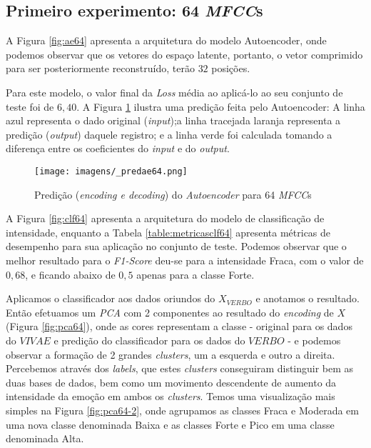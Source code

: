 \subsection{Primeiro experimento: 64 \textit{MFCC}s}

A Figura \ref{fig:ae64} apresenta a arquitetura do modelo Autoencoder, onde podemos observar que os vetores do espaço latente, portanto, o vetor comprimido para ser posteriormente reconstruído, terão $32$ posições.

Para este modelo, o valor final da \textit{Loss} média ao aplicá-lo ao seu conjunto de teste foi de $6,40$. A Figura \ref{fig:predae64} ilustra uma predição feita pelo Autoencoder: A linha azul representa o dado original (\textit{input});a linha tracejada laranja representa a predição (\textit{output}) daquele registro; e a linha verde foi calculada tomando a diferença entre os coeficientes do \textit{input} e do \textit{output}.

\begin{figure}[h]
    \centering
    \texttt{[image: imagens/\_predae64.png]}
    \caption{\label{fig:predae64}Predição (\textit{encoding e decoding}) do \textit{Autoencoder} para 64 \textit{MFCC}s}
\end{figure}

A Figura \ref{fig:clf64} apresenta a arquitetura do modelo de classificação de intensidade, enquanto a Tabela \ref{table:metricasclf64} apresenta métricas de desempenho para sua aplicação no conjunto de teste. Podemos observar que o melhor resultado para o \textit{F1-Score} deu-se para a intensidade Fraca, com o valor de $0,68$, e ficando abaixo de $0,5$ apenas para a classe Forte.

Aplicamos o classificador aos dados oriundos do $X_{VERBO}$ e anotamos o resultado. Então efetuamos um \textit{PCA} com 2 componentes ao resultado do \textit{encoding} de $X$ (Figura \ref{fig:pca64}), onde as cores representam a classe - original para os dados do $VIVAE$ e predição do classificador para os dados do $VERBO$ - e podemos observar a formação de 2 grandes \textit{clusters}, um a esquerda e outro a direita. Percebemos através dos \textit{labels}, que estes \textit{clusters} conseguiram distinguir bem as duas bases de dados, bem como um movimento descendente de aumento da intensidade da emoção em ambos os \textit{clusters}. Temos uma visualização mais simples na Figura \ref{fig:pca64-2}, onde agrupamos as classes Fraca e Moderada em uma nova classe denominada Baixa e as classes Forte e Pico em uma classe denominada Alta.

